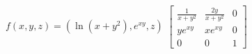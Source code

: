 {
$f(x,y,z) = (\ln (x+y^2), e^{xy}, z)$
}
{
$\begin{bmatrix}
	\frac{1}{x+y^2} & \frac{2y}{x+y^2} & 0\\
	ye^{xy} & xe^{xy} & 0\\
	0 & 0 & 1
\end{bmatrix}$
}
